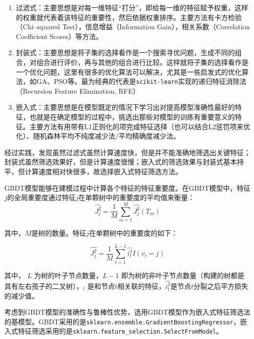 \documentclass[bwprint]{gmcmthesis}
\begin{document}
\begin{enumerate}
	\item 过滤式：主要思想是对每一维特征“打分”，即给每一维的特征赋予权重，这样的权重就代表着该特征的重要性，然后依据权重排序。主要方法有卡方检验（Chi--squared Test），信息增益（Information Gain），相关系数（Correlation Coefficient Scores）等方法。
	\item 封装式：主要思想是将子集的选择看作是一个搜索寻优问题，生成不同的组合，对组合进行评价，再与其他的组合进行比较。这样就将子集的选择看作是一个优化问题，这里有很多的优化算法可以解决，尤其是一些启发式的优化算法，如GA、PSO等。最为经典的代表是\texttt{scikit-learn}实现的递归特征消除法（Recursion Feature Elimination, RFE）
	\item 嵌入式：主要思想是在模型既定的情况下学习出对提高模型准确性最好的特征，也就是在确定模型的过程中，挑选出那些对模型的训练有重要意义的特征。主要方法有用带有L1正则化的项完成特征选择（也可以结合L2惩罚项来优化）、随机森林平均不纯度减少法/平均精确度减少法。
\end{enumerate}

经过实践，发现虽然过滤式虽然计算速度快，但是并不能准确地筛选出关键特征；封装式虽然筛选效果好，但是计算速度很慢；嵌入式的筛选效果与封装式基本持平，但计算速度相对快很多，故选择嵌入式特征筛选方法。


GBDT模型能够在建模过程中计算各个特征的特征重要度。在GBDT模型中，特征$j$的全局重要度通过特征$j$在单颗树中的重要度的平均值来衡量： 
\begin{equation}\label{eq:gbdt-1}
	\hat{J^2_j} = \frac{1}{M} \sum^M_{m=1}\hat{J^2_j}(T_m)
\end{equation}

其中，$M$是树的数量。特征$j$在单颗树中的重要度的如下：

\begin{equation}\label{eq:gbdt-2}
	\hat{J^2_j} = \frac{1}{M} \sum^{L-1}_{t=1}\hat{i^2_t} I (v_t=j)
\end{equation}

其中， $L$ 为树的叶子节点数量，$L−1$ 即为树的非叶子节点数量（构建的树都是具有左右孩子的二叉树），$_t$ 是和节点t相关联的特征，$\hat{i^2_t}$是节点$t$分裂之后平方损失的减少值。

考虑到GBDT模型的准确性与鲁棒性优势，选用GBDT模型作为嵌入式特征筛选法的基模型。GBDT采用的是\texttt{sklearn.ensemble.GradientBoostingRegressor}，嵌入式特征筛选采用的是\texttt{sklearn.feature\_selection.SelectFromModel}。
\end{document}
